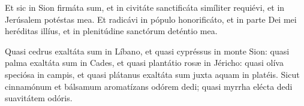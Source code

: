 



Et sic in Sion firmáta sum, et in civitáte sanctificáta simíliter requiévi,
et in Jerúsalem potéstas mea.
Et radicávi in pópulo honorificáto, et in parte Dei mei heréditas illíus,
et in plenitúdine sanctórum deténtio mea.

\tuAutem


\vfill \pagebreak






Quasi cedrus exaltáta sum in Líbano, et quasi cypréssus in monte Sion:
quasi palma exaltáta sum in Cades, et quasi plantátio rosæ in Jéricho:
quasi olíva speciósa in campis, et quasi plátanus exaltáta sum juxta aquam
in platéis.
Sicut cinnamónum et bálsamum aromatízans odórem dedi; 
quasi myrrha elécta dedi suavitátem odóris.

\tuAutem



